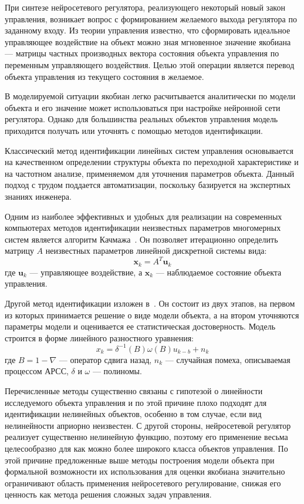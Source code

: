При синтезе нейросетевого регулятора, реализующего некоторый новый
закон управления, возникает вопрос с формированием желаемого выхода
регулятора по заданному входу.  Из теории управления известно, что
сформировать идеальное управляющее воздействие на объект можно зная
мгновенное значение якобиана --- матрицы частных производных вектора
состояния объекта управления по переменным управляющего воздействия.
Целью этой операции является перевод объекта управления из текущего
состояния в желаемое.

В моделируемой ситуации якобиан легко расчитывается аналитически по
модели объекта и его значение может использоваться при настройке
нейронной сети регулятора.  Однако для большинства реальных объектов
управления модель приходится получать или уточнять с помощью методов
идентификации.

Классический метод идентификации линейных систем управления
основывается на качественном определении структуры объекта по
переходной характеристике и на частотном анализе, применяемом для
уточнения параметров объекта.  Данный подход с трудом поддается
автоматизации, поскольку базируется на экспертных знаниях инженера.

Одним из наиболее эффективных и удобных для реализации на современных
компьютерах методов идентификации неизвестных параметров многомерных
систем является алгоритм Качмажа~\cite{bolonchin91}.  Он позволяет
итерационно определить матрицу $A$ неизвестных параметров линейной
дискретной системы вида:
\begin{equation}\label{kachmaj}
\mathbf{x}_k=A^T \mathbf{u}_k
\end{equation} где $\mathbf{u}_k$ --- управляющее воздействие, а
$\mathbf{x}_k$ --- наблюдаемое состояние объекта управления.

Другой метод идентификации изложен в~\cite{boxjenk74}.  Он состоит из
двух этапов, на первом из которых принимается решение о виде модели
объекта, а на втором уточняются параметры модели и оценивается ее
статистическая достоверность.  Модель строится в форме линейного
разностного уравнения:
\begin{equation}\label{arima}
x_k=\delta^{-1}(B)\omega(B) u_{k-b} + n_k
\end{equation} где $B=1-\nabla$ --- оператор сдвига назад, $n_k$ ---
случайная помеха, описываемая процессом АРСС, $\delta$ и $\omega$ ---
полиномы.

Перечисленные методы существенно связаны с гипотезой о линейности
исследуемого объекта управления и по этой причине плохо подходят для
идентификации нелинейных объектов, особенно в том случае, если вид
нелинейности априорно неизвестен.  С другой стороны, нейросетевой
регулятор реализует существенно нелинейную функцию, поэтому его
применение весьма целесообразно для как можно более широкого класса
объектов управления.  По этой причине предложенные выше методы
построения модели объекта при формальной возможности их использования
для оценки якобиана значительно ограничивают область применения
нейросетевого регулирование, снижая его ценность как метода решения
сложных задач управления.

